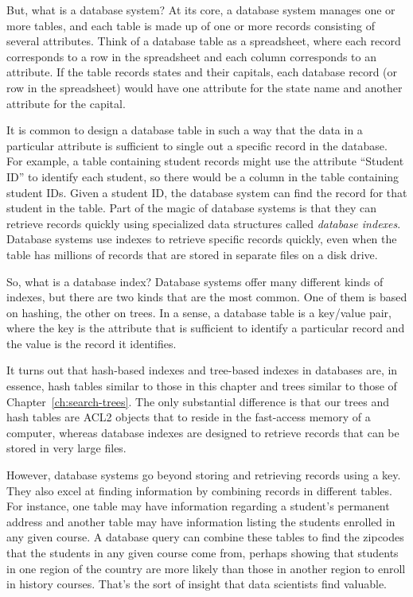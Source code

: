 But, what is a database system? At its core, a database system
manages one or more tables, and each table is made up of one or more
records consisting of several attributes.
Think of a database table as a
spreadsheet, where each record corresponds to a row in the spreadsheet
and each column corresponds to an attribute. If the table
records states and their capitals, each database
record (or row in the spreadsheet) would have one attribute for the
state name and another attribute for the capital.

It is common to design a database table in such a way that the
data in a particular attribute is sufficient
to single out a specific record in the database.
For example, a table containing student records might use the attribute
``Student ID'' to identify each student, so there would be
a column in the table containing student IDs.
Given a student ID, the
database system can find the record for that student in the
table. Part of the magic of database systems is that they can retrieve
records quickly using specialized data
structures called \emph{database indexes}.
Database systems use indexes to retrieve specific records quickly,
even when the table has millions of records that are stored
in separate files on a disk drive.

So, what is a database index? Database systems
offer many different kinds of indexes, but there are two kinds that are
the most common. One of them is based on hashing, the other on trees.
In a sense, a database
table is a key/value pair, where the key is the attribute that is
sufficient to identify a particular record and the value is the record
it identifies.

It turns out that hash-based indexes and tree-based indexes
in databases are,
in essence, hash tables similar to those in this chapter
and trees similar to those of Chapter~\ref{ch:search-trees}.
The only substantial difference
is that our trees and hash tables are ACL2 objects that
to reside in the fast-access memory of a computer,
whereas database indexes are designed to retrieve records
that can be stored in very large files.

However, database systems go beyond storing and retrieving records
using a key. They also excel at finding information by combining
records in different tables. For instance, one table may have
information regarding a student's permanent address and another table
may have information listing the students enrolled in any given course.
A database query can combine these tables to find the zipcodes that
the students in any given course come from, perhaps showing that students in one
region of the country are more likely than those in another region to
enroll in history courses. That's the sort of insight that
data scientists find valuable.

